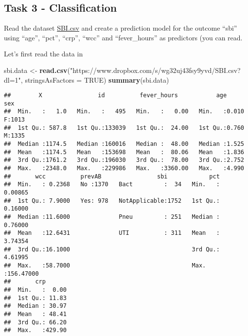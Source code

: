 \documentclass[
]{book}
\newenvironment{Shaded}{\begin{snugshade}}{\end{snugshade}}
\newcommand{\AttributeTok}[1]{\textcolor[rgb]{0.13,0.29,0.53}{#1}}
\newcommand{\ConstantTok}[1]{\textcolor[rgb]{0.56,0.35,0.01}{#1}}
\newcommand{\FunctionTok}[1]{\textcolor[rgb]{0.13,0.29,0.53}{\textbf{#1}}}
\newcommand{\NormalTok}[1]{#1}
\newcommand{\OtherTok}[1]{\textcolor[rgb]{0.56,0.35,0.01}{#1}}
\newcommand{\StringTok}[1]{\textcolor[rgb]{0.31,0.60,0.02}{#1}}
\begin{document}
\subsection*{Task 3 - Classification}\label{task-3---classification}

Read the dataset \href{https://www.dropbox.com/s/wg32uj43fsy9yvd/SBI.csv?dl=0}{SBI.csv}
and create a prediction model for the outcome ``sbi'' using ``age'', ``pct'', ``crp'',
``wcc'' and ``fever\_hours'' as predictors (you can read.

Let's first read the data in

\begin{Shaded}
\begin{Highlighting}[]
\NormalTok{sbi.data     }\OtherTok{\textless{}{-}} 
  \FunctionTok{read.csv}\NormalTok{(}\StringTok{"https://www.dropbox.com/s/wg32uj43fsy9yvd/SBI.csv?dl=1"}\NormalTok{, }
           \AttributeTok{stringsAsFactors =} \ConstantTok{TRUE}\NormalTok{)}
\FunctionTok{summary}\NormalTok{(sbi.data)}
\end{Highlighting}
\end{Shaded}

\begin{verbatim}
##        X                id          fever_hours           age        sex     
##  Min.   :   1.0   Min.   :   495   Min.   :   0.00   Min.   :0.010   F:1013  
##  1st Qu.: 587.8   1st Qu.:133039   1st Qu.:  24.00   1st Qu.:0.760   M:1335  
##  Median :1174.5   Median :160016   Median :  48.00   Median :1.525           
##  Mean   :1174.5   Mean   :153698   Mean   :  80.06   Mean   :1.836           
##  3rd Qu.:1761.2   3rd Qu.:196030   3rd Qu.:  78.00   3rd Qu.:2.752           
##  Max.   :2348.0   Max.   :229986   Max.   :3360.00   Max.   :4.990           
##       wcc          prevAB                sbi            pct           
##  Min.   : 0.2368   No :1370   Bact         :  34   Min.   :  0.00865  
##  1st Qu.: 7.9000   Yes: 978   NotApplicable:1752   1st Qu.:  0.16000  
##  Median :11.6000              Pneu         : 251   Median :  0.76000  
##  Mean   :12.6431              UTI          : 311   Mean   :  3.74354  
##  3rd Qu.:16.1000                                   3rd Qu.:  4.61995  
##  Max.   :58.7000                                   Max.   :156.47000  
##       crp        
##  Min.   :  0.00  
##  1st Qu.: 11.83  
##  Median : 30.97  
##  Mean   : 48.41  
##  3rd Qu.: 66.20  
##  Max.   :429.90
\end{verbatim}
\end{document}

